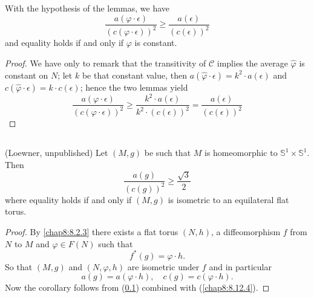 \subsection{}\label{chap8:8.12.7}

\begin{prop*}
With the hypothesis of the lemmas, we have
$$
\frac{a(\varphi\cdot\epsilon)}{(c(\varphi\cdot\epsilon))^{2}}\geq
\frac{a(\epsilon)}{(c(\epsilon))^{2}} 
$$
and equality holds if and only if $\varphi$ is constant.
\end{prop*}

\begin{proof}
We have only to remark that the transitivity of $\mathscr{C}$ implies
the average $\widehat{\varphi}$ is constant on $N$; let $k$ be that
constant value, then $a(\widehat{\varphi}\cdot\epsilon)=k^{2}\cdot
a(\epsilon)$ and $c(\widehat{\varphi}\cdot\epsilon)=k\cdot
c(\epsilon)$; hence the two lemmas yield
$$
\frac{a(\varphi\cdot\epsilon)}{(c(\varphi\cdot\epsilon))^{2}}\geq
\frac{k^{2}\cdot a(\epsilon)}{k^{2}\cdot
  (c(\epsilon))^{2}}=\frac{a(\epsilon)}{(c(\epsilon))^{2}} 
$$
\end{proof}

\subsection{}\label{chap8:8.12.8}

\begin{coro*}(Loewner, unpublished)
Let $(M,g)$ be such that $M$ is homeomorphic to
$\mathbb{S}^{1}\times\mathbb{S}^{1}$. Then
$$
\frac{a(g)}{(c(g))^{2}}\geq\frac{\sqrt{3}}{2}
$$
where equality holds if and only if $(M,g)$ is isometric to an
equilateral flat torus.
\end{coro*}

\begin{proof}
By \eqref{chap8:8.2.3} there exists a flat torus $(N,h)$, a diffeomorphism
$f$ from $N$ to $M$ and $\varphi\in F(N)$ such that
$$
f^{\ast}(g)=\varphi\cdot h.
$$
So \pageoriginale that $(M,g)$ and $(N,\varphi,h)$ are isometric under
$f$ and in particular
$$
a(g)=a(\varphi\cdot h),\quad c(g)=c(\varphi\cdot h).
$$
Now the corollary follows from (\ref{chap8:8.12.7}) combined with
(\ref{chap8:8.12.4}).
\end{proof}

\subsection{}\label{chap8:8.12.9}

